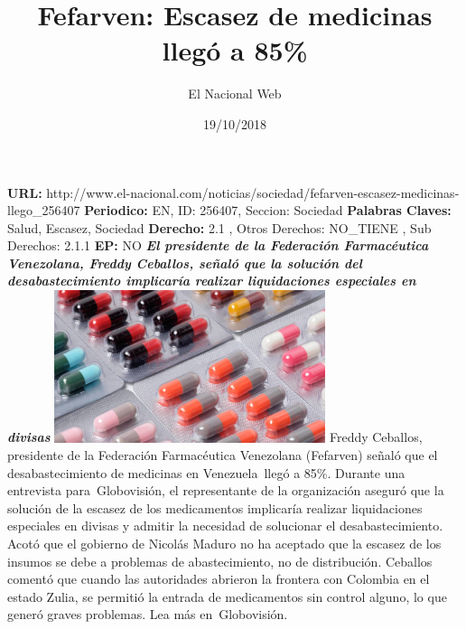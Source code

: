\documentclass{article}%
\title{\textbf{Fefarven: Escasez de medicinas llegó a 85\%}}%
\author{El Nacional Web}%
\date{19/10/2018}%
\begin{document}
%
\normalsize%
\maketitle%
\textbf{URL: }%
http://www.el{-}nacional.com/noticias/sociedad/fefarven{-}escasez{-}medicinas{-}llego\_256407\newline%
%
\textbf{Periodico: }%
EN, %
ID: %
256407, %
Seccion: %
Sociedad\newline%
%
\textbf{Palabras Claves: }%
Salud, Escasez, Sociedad\newline%
%
\textbf{Derecho: }%
2.1%
, Otros Derechos: %
NO\_TIENE%
, Sub Derechos: %
2.1.1%
\newline%
%
\textbf{EP: }%
NO\newline%
\newline%
%
\textbf{\textit{El presidente de la Federación Farmacéutica Venezolana, Freddy Ceballos, señaló que la solución del desabastecimiento implicaría realizar liquidaciones especiales en divisas}}%
\newline%
\newline%
%
\includegraphics[width=300px]{262.jpg}%
\newline%
%
Freddy Ceballos, presidente de la Federación Farmacéutica Venezolana (Fefarven) señaló que el desabastecimiento de medicinas en Venezuela~llegó a 85\%.%
\newline%
%
Durante una entrevista para~Globovisión, el representante de la organización aseguró que la solución de la escasez de los medicamentos implicaría realizar liquidaciones especiales en divisas y admitir la necesidad de solucionar el desabastecimiento.%
\newline%
%
Acotó que el gobierno de Nicolás Maduro no ha aceptado que la escasez de los insumos se debe a problemas de abastecimiento, no de distribución.%
\newline%
%
Ceballos comentó que cuando las autoridades abrieron la frontera con Colombia en el estado Zulia, se permitió la entrada de medicamentos sin control alguno, lo que generó graves problemas.%
\newline%
%
Lea más en~Globovisión.%
\newline%
%
\end{document}
